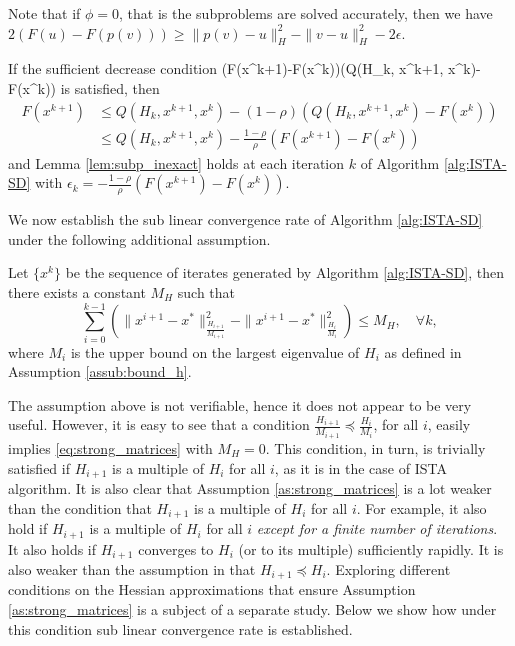 \documentclass[11pt]{article}
\numberwithin{equation}{section}
\begin{document}
\vskip5mm

Note that if $\phi=0$, that is the subproblems are solved accurately, then we have $2(F(u) - F(p( v))) \geq \|p( v)-u\|_H^2 - \|v-u\|_H^2-2\epsilon$.

If the sufficient decrease  condition 
\bea\label{eq:dec_cond}
(F(x^{k+1})-F(x^k))\leq \rho (Q(H_k, x^{k+1}, x^k)- F(x^k))
\eea
is satisfied, then
\begin{align*}
    F(x^{k+1})
    &\leq Q(H_k, x^{k+1}, x^k)  - (1-\rho) \left( Q(H_k, x^{k+1}, x^k)- F(x^k) \right) \\
    &\leq Q(H_k,  x^{k+1}, x^k)  - \frac{1-\rho}{\rho} (F(x^{k+1})- F(x^k))
\end{align*}
and  Lemma \ref{lem:subp_inexact} holds at each iteration $k$ of Algorithm \ref{alg:ISTA-SD} with  $\epsilon_k=-\frac{1-\rho}{\rho}(F(x^{k+1})- F(x^k))$. 

We now  establish the sub linear convergence rate of Algorithm \ref{alg:ISTA-SD} under the following additional assumption. 

\begin{assumption}\label{as:strong_matrices}
Let $\{x^k\}$ be the sequence of iterates generated by Algorithm \ref{alg:ISTA-SD}, then there exists a constant $M_H$ such that 
 \begin{equation}\label{eq:strong_matrices}
 \sum_{i=0}^{k-1}(\|x^{i+1} - x^*\|^2_\frac{H_{i+1}}{M_{i+1}}-\|x^{i+1} - x^*\|^2_ \frac{H_i}{M_i})\leq M_H, \quad \forall k,
 \end{equation}
 where $M_i$ is the upper bound on the largest eigenvalue of $H_i$ as defined in Assumption \ref{assub:bound_h}. 
 \end{assumption}
 
 The assumption above is not verifiable, hence it does not appear to be very useful. However, it is easy to see that a condition 
 $\frac{H_{i+1}}{M_{i+1}}\preceq \frac{H_i}{M_i}$, for all $i$, easily implies \eqref{eq:strong_matrices} with $M_H=0$. This condition, in turn,
  is trivially satisfied if $H_{i+1}$
 is a multiple of $H_i$ for all $i$, as it is in the case of ISTA algorithm. It is also clear that Assumption \ref{as:strong_matrices} is a lot weaker than
 the condition that $H_{i+1}$ is a multiple of $H_i$ for all $i$. For example, it also hold if $H_{i+1}$ is a multiple of $H_i$ for all $i$ {\em except for a finite number of iterations}. It also holds if $H_{i+1}$ converges to $H_i$ (or to its multiple) sufficiently rapidly. It is also weaker than the assumption
 in \cite{Jiangetal2012} that $H_{i+1}\preceq {H_i}$. Exploring different conditions on the Hessian approximations that ensure Assumption \ref{as:strong_matrices}  is a subject of a separate study. Below we show how under this condition sub linear convergence rate is established. 
\end{document}
